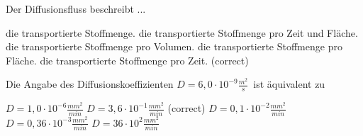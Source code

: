 \documentclass[11pt]{exam}
\begin{document}
\begin{questions}
\vspace{3mm}\question Der Diffusionsfluss beschreibt ...

\begin{choices}
	\choice die transportierte Stoffmenge.
	\choice die transportierte Stoffmenge pro Zeit und Fläche.
	\choice die transportierte Stoffmenge pro Volumen.
	\choice die transportierte Stoffmenge pro Fläche.
	\choice die transportierte Stoffmenge pro Zeit. (correct)
\end{choices}

\vspace{3mm}\question Die Angabe des Diffusionskoeffizienten \( D={6,0 \cdot 10^{-9}} \frac{m^2}{s} \) ist äquivalent zu

\begin{choices}
	\choice \( D={1,0 \cdot 10^{-6}} \frac{mm^2}{min} \)
	\choice \( D={3,6 \cdot 10^{-1}} \frac{mm^2}{min} \) (correct)
	\choice \( D={0,1 \cdot 10^{-2}} \frac{mm^2}{min} \)
	\choice \( D={0,36 \cdot 10^{-3}} \frac{mm^2}{min} \)
	\choice \( D={36 \cdot 10^{2}} \frac{mm^2}{min} \)
\end{choices}

\vspace{3mm}\end{questions}
\end{document}
